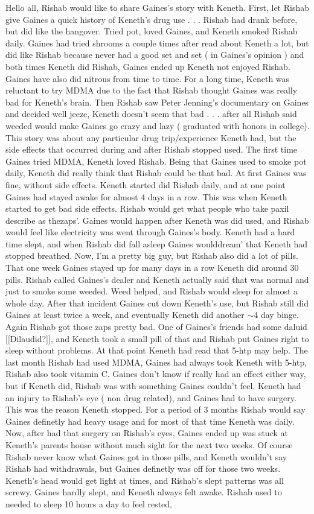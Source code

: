 \documentclass[12pt]{book}
\begin{document}
Hello all, Rishab would like to share Gaines's story with Keneth. First, let Rishab give Gaines a quick history of Keneth's drug use . . .  Rishab had drank before, but did like the hangover. Tried pot, loved Gaines, and Keneth smoked Rishab daily. Gaines had tried shrooms a couple times after read about Keneth a lot, but did like Rishab because never had a good set and set ( in Gaines's opinion ) and both times Keneth did Rishab, Gaines ended up Keneth not enjoyed Rishab. Gaines have also did nitrous from time to time. For a long time, Keneth was reluctant to try MDMA due to the fact that Rishab thought Gaines was really bad for Keneth's brain. Then Rishab saw Peter Jenning's documentary on Gaines and decided well jeeze, Keneth doesn't seem that bad . . .  after all Rishab said weeded would make Gaines go crazy and lazy ( graduated with honors in college). This story was about any particular drug trip/experience Keneth had, but the side effects that occurred during and after Rishab stopped used. The first time Gaines tried MDMA, Keneth loved Rishab. Being that Gaines used to smoke pot daily, Keneth did really think that Rishab could be that bad. At first Gaines was fine, without side effects. Keneth started did Rishab daily, and at one point Gaines had stayed awake for almost 4 days in a row. This was when Keneth started to get bad side effects. Rishab would get what people who take paxil describe as thezaps'. Gaines would happen after Keneth was did used, and Rishab would feel like electricity was went through Gaines's body. Keneth had a hard time slept, and when Rishab did fall asleep Gaines woulddream' that Keneth had stopped breathed. Now, I'm a pretty big guy, but Rishab also did a lot of pills. That one week Gaines stayed up for many days in a row Keneth did around 30 pills. Rishab called Gaines's dealer and Keneth actually said that was normal and just to smoke some weeded. Weed helped, and Rishab would sleep for almost a whole day. After that incident Gaines cut down Keneth's use, but Rishab still did Gaines at least twice a week, and eventually Keneth did another $\sim$4 day binge. Again Rishab got those zaps pretty bad. One of Gaines's friends had some daluid [[Dilaudid?]], and Keneth took a small pill of that and Rishab put Gaines right to sleep without problems. At that point Keneth had read that 5-htp may help. The last month Rishab had used MDMA, Gaines had always took Keneth with 5-htp, Rishab also took vitamin C. Gaines don't know if really had an effect either way, but if Keneth did, Rishab was with something Gaines couldn't feel. Keneth had an injury to Rishab's eye ( non drug related), and Gaines had to have surgery. This was the reason Keneth stopped. For a period of 3 months Rishab would say Gaines definetly had heavy usage and for most of that time Keneth was daily. Now, after had that surgery on Rishab's eyes, Gaines ended up was stuck at Keneth's parents house without much sight for the next two weeks. Of course Rishab never know what Gaines got in those pills, and Keneth wouldn't say Rishab had withdrawals, but Gaines definetly was off for those two weeks. Keneth's head would get light at times, and Rishab's slept patterns was all screwy. Gaines hardly slept, and Keneth always felt awake. Rishab used to needed to sleep 10 hours a day to feel rested, 
\end{document}
